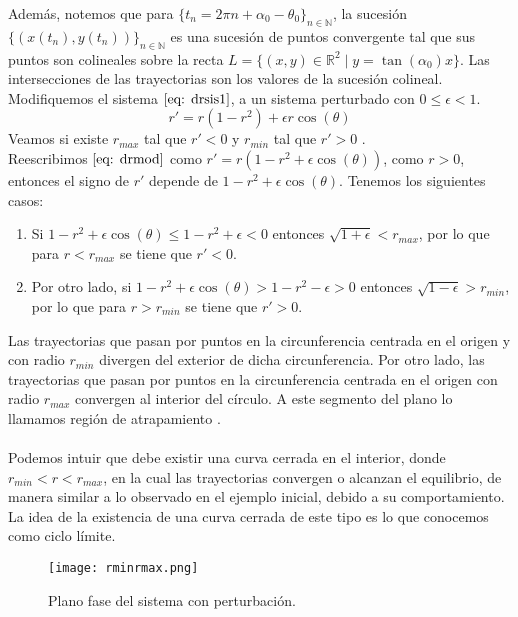 Además, notemos que para $\{t_n=2\pi n+\alpha_0-\theta_0\}_{n\in \mathbb{N}}$,
la sucesión $\{(x(t_n),y(t_n))\}_{n\in\mathbb{N}}$ es una sucesión
de puntos convergente tal que sus puntos son colineales sobre la recta
$L=\{(x,y)\in\mathbb{R}^2\mid y=\tan(\alpha_0)x \}$. Las intersecciones de las trayectorias
son los valores de la sucesión colineal.\\

Modifiquemos el sistema $\eqref{eq: drsis1}$, a un sistema perturbado
con $0\leq\epsilon<1$.
\begin{equation}\label{eq: drmod}
	r'=r(1-r^2)+\epsilon r\cos(\theta)
\end{equation}
Veamos si existe $r_{max}$ tal que $r'<0$ y $r_{min}$ tal que $r'>0$ \cite{bender2013advanced}.\\

Reescribimos $\eqref{eq: drmod}$ como $r'=r(1-r^2+\epsilon \cos(\theta))$, como $r>0$,
entonces el signo de $r'$ depende de $1-r^2+\epsilon \cos(\theta)$.
Tenemos los siguientes casos:

\begin{enumerate}
	\item Si $1-r^2+\epsilon\cos(\theta)\leq 1-r^2+\epsilon<0$
	      entonces $\sqrt{1+\epsilon}<r_{max}$, por lo que para $r<r_{max}$ se tiene que $r'<0$.
	\item Por otro lado, si	$1-r^2+\epsilon\cos(\theta)>1-r^2-\epsilon>0$
	      entonces $\sqrt{1-\epsilon}>r_{min}$, por lo que para $r>r_{min}$ se tiene que $r'>0$.
\end{enumerate}

Las trayectorias que pasan por puntos en la circunferencia centrada
en el origen y con radio $r_{min}$
divergen del exterior de dicha circunferencia. Por otro lado,
las trayectorias que pasan por puntos en la circunferencia centrada
en el origen con radio $r_{max}$
convergen al interior del círculo.
A este segmento del plano lo llamamos región de atrapamiento \cite{hinch1991perturbation}.\\
\\Podemos intuir que debe existir
una curva cerrada en el interior, donde $r_{min}<r<r_{max}$, en la cual
las trayectorias convergen o alcanzan el equilibrio, de manera similar
a lo observado en el ejemplo
inicial, debido a su comportamiento. La idea de la existencia de una
curva cerrada de este tipo es lo que conocemos como ciclo límite.
\begin{figure}[h]
	\centering
	\texttt{[image: rminrmax.png]}
	\caption{Plano fase del sistema con perturbación.}
\end{figure}

